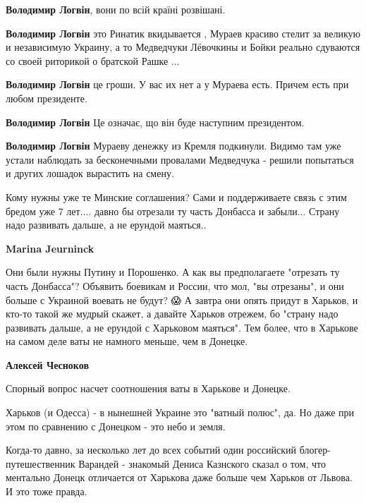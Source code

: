 \begin{itemize}
\begin{itemize} %
\textbf{Володимир Логвін}, вони по всій країні розвішані.

\textbf{Володимир Логвін} это Ринатик вкидывается , Мураев красиво стелит за великую и независимую Украину, а то Медведчуки Лёвочкины и Бойки реально сдуваются со своей риторикой о братской Рашке ...

\textbf{Володимир Логвін} це гроши. У вас их нет а у Мураева есть. Причем есть при любом президенте.

\textbf{Володимир Логвін} Це означає, що він буде наступним президентом.

\textbf{Володимир Логвін} Мураеву денежку из Кремля подкинули. Видимо там уже устали наблюдать за бесконечными провалами Медведчука - решили попытаться и других лошадок вырастить на смену.
\end{itemize} %


Кому нужны уже те Минские соглашения? Сами и поддерживаете связь с этим бредом
уже 7 лет.... давно бы отрезали ту часть Донбасса и забыли... Страну надо
развивать дальше, а не ерундой маяться..

\begin{itemize} %
\textbf{Marina Jeurninck} 

Они были нужны Путину и Порошенко. А как вы предполагаете "отрезать ту часть
Донбасса"? Объявить боевикам и России, что мол, "вы отрезаны", и они больше с
Украиной воевать не будут? 😱 А завтра они опять придут в Харьков, и кто-то
такой же мудрый скажет, а давайте Харьков отрежем, бо "страну надо развивать
дальше, а не ерундой с Харьковом маяться". Тем более, что в Харькове на самом
деле ваты не намного меньше, чем в Донецке.


\textbf{Алексей Чесноков} 

Спорный вопрос насчет соотношения ваты в Харькове и Донецке.

Харьков (и Одесса) - в нынешней Украине это "ватный полюс", да. Но даже при
этом по сравнению с Донецком - это небо и земля.

Когда-то давно, за несколько лет до всех событий один российский
блогер-путешественник Варандей - знакомый Дениса Казнского сказал о том, что
ментально Донецк отличается от Харькова даже больше чем Харьков от Львова. И
это тоже правда.



\end{itemize}
\end{itemize}
